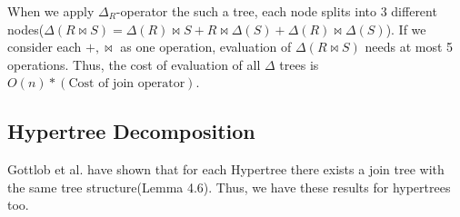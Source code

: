 \documentclass[12pt]{article}
\begin{document}
When we apply $\Delta_{R}$-operator the such a tree, each node splits into 3 different nodes($\Delta(R\bowtie S)=\Delta(R)\bowtie S+R\bowtie\Delta(S)+\Delta(R)\bowtie\Delta(S)$). If we consider each $+,\bowtie$ as one operation, evaluation of $\Delta(R\bowtie S)$ needs at most 5 operations. Thus, the cost of evaluation of all $\Delta$ trees is $O(n)*(\text{Cost of join operator})$.


\subsection{Hypertree Decomposition}
Gottlob et al. have shown that for each Hypertree there exists a join tree with the same tree structure(Lemma 4.6). Thus, we have these results for hypertrees too.
\end{document}
